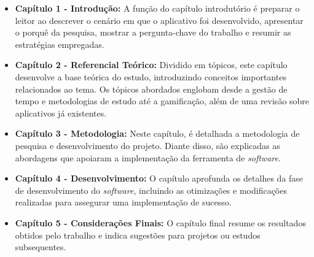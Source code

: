 \begin{itemize}

\item \textbf{Capítulo 1 - Introdução:} A função do capítulo introdutório é preparar o leitor ao descrever o cenário em que o aplicativo foi desenvolvido, apresentar o porquê da pesquisa, mostrar a pergunta-chave do trabalho e resumir as estratégias empregadas.

\item \textbf{Capítulo 2 - Referencial Teórico:} Dividido em tópicos, este capítulo desenvolve a base teórica do estudo, introduzindo conceitos importantes relacionados ao tema.
Os tópicos abordados englobam desde a gestão de tempo e metodologias de estudo até a gamificação, além de uma revisão sobre aplicativos já existentes.

\item \textbf{Capítulo 3 - Metodologia:} Neste capítulo, é detalhada a metodologia de pesquisa e desenvolvimento do projeto.
Diante disso, são explicadas as abordagens que apoiaram a implementação da ferramenta de \textit{software}.

\item \textbf{Capítulo 4 - Desenvolvimento:} O capítulo aprofunda os detalhes da fase de desenvolvimento do \textit{software}, incluindo as otimizações e modificações realizadas para assegurar uma implementação de sucesso.

\item \textbf{Capítulo 5 - Considerações Finais:} O capítulo final resume os resultados obtidos pelo trabalho e indica sugestões para projetos ou estudos subsequentes.

\end{itemize}
